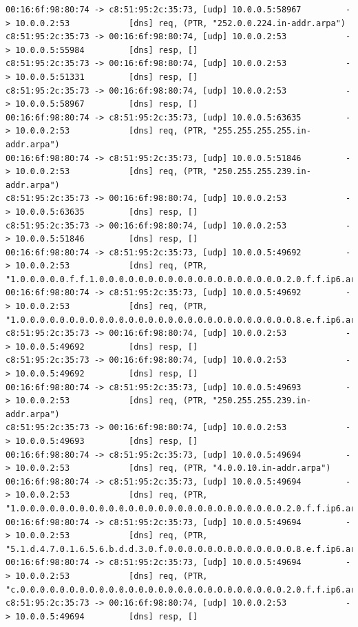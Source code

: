 \documentclass[11pt]{diazessay} %
\begin{document}
\begin{lstlisting}
00:16:6f:98:80:74 -> c8:51:95:2c:35:73, [udp] 10.0.0.5:58967         -> 10.0.0.2:53            [dns] req, (PTR, "252.0.0.224.in-addr.arpa")
c8:51:95:2c:35:73 -> 00:16:6f:98:80:74, [udp] 10.0.0.2:53            -> 10.0.0.5:55984         [dns] resp, []
c8:51:95:2c:35:73 -> 00:16:6f:98:80:74, [udp] 10.0.0.2:53            -> 10.0.0.5:51331         [dns] resp, []
c8:51:95:2c:35:73 -> 00:16:6f:98:80:74, [udp] 10.0.0.2:53            -> 10.0.0.5:58967         [dns] resp, []
00:16:6f:98:80:74 -> c8:51:95:2c:35:73, [udp] 10.0.0.5:63635         -> 10.0.0.2:53            [dns] req, (PTR, "255.255.255.255.in-addr.arpa")
00:16:6f:98:80:74 -> c8:51:95:2c:35:73, [udp] 10.0.0.5:51846         -> 10.0.0.2:53            [dns] req, (PTR, "250.255.255.239.in-addr.arpa")
c8:51:95:2c:35:73 -> 00:16:6f:98:80:74, [udp] 10.0.0.2:53            -> 10.0.0.5:63635         [dns] resp, []
c8:51:95:2c:35:73 -> 00:16:6f:98:80:74, [udp] 10.0.0.2:53            -> 10.0.0.5:51846         [dns] resp, []
00:16:6f:98:80:74 -> c8:51:95:2c:35:73, [udp] 10.0.0.5:49692         -> 10.0.0.2:53            [dns] req, (PTR, "1.0.0.0.0.0.f.f.1.0.0.0.0.0.0.0.0.0.0.0.0.0.0.0.0.0.0.0.2.0.f.f.ip6.arpa")
00:16:6f:98:80:74 -> c8:51:95:2c:35:73, [udp] 10.0.0.5:49692         -> 10.0.0.2:53            [dns] req, (PTR, "1.0.0.0.0.0.0.0.0.0.0.0.0.0.0.0.0.0.0.0.0.0.0.0.0.0.0.0.0.8.e.f.ip6.arpa")
c8:51:95:2c:35:73 -> 00:16:6f:98:80:74, [udp] 10.0.0.2:53            -> 10.0.0.5:49692         [dns] resp, []
c8:51:95:2c:35:73 -> 00:16:6f:98:80:74, [udp] 10.0.0.2:53            -> 10.0.0.5:49692         [dns] resp, []
00:16:6f:98:80:74 -> c8:51:95:2c:35:73, [udp] 10.0.0.5:49693         -> 10.0.0.2:53            [dns] req, (PTR, "250.255.255.239.in-addr.arpa")
c8:51:95:2c:35:73 -> 00:16:6f:98:80:74, [udp] 10.0.0.2:53            -> 10.0.0.5:49693         [dns] resp, []
00:16:6f:98:80:74 -> c8:51:95:2c:35:73, [udp] 10.0.0.5:49694         -> 10.0.0.2:53            [dns] req, (PTR, "4.0.0.10.in-addr.arpa")
00:16:6f:98:80:74 -> c8:51:95:2c:35:73, [udp] 10.0.0.5:49694         -> 10.0.0.2:53            [dns] req, (PTR, "1.0.0.0.0.0.0.0.0.0.0.0.0.0.0.0.0.0.0.0.0.0.0.0.0.0.0.0.2.0.f.f.ip6.arpa")
00:16:6f:98:80:74 -> c8:51:95:2c:35:73, [udp] 10.0.0.5:49694         -> 10.0.0.2:53            [dns] req, (PTR, "5.1.d.4.7.0.1.6.5.6.b.d.d.3.0.f.0.0.0.0.0.0.0.0.0.0.0.0.0.8.e.f.ip6.arpa")
00:16:6f:98:80:74 -> c8:51:95:2c:35:73, [udp] 10.0.0.5:49694         -> 10.0.0.2:53            [dns] req, (PTR, "c.0.0.0.0.0.0.0.0.0.0.0.0.0.0.0.0.0.0.0.0.0.0.0.0.0.0.0.2.0.f.f.ip6.arpa")
c8:51:95:2c:35:73 -> 00:16:6f:98:80:74, [udp] 10.0.0.2:53            -> 10.0.0.5:49694         [dns] resp, []

\end{lstlisting}
\end{document}
